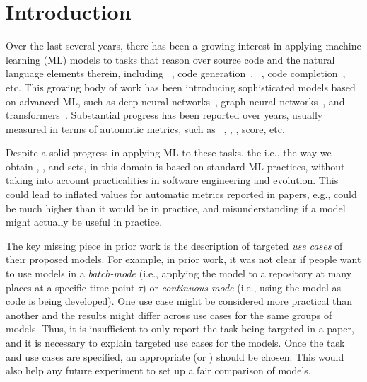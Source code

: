 \section{Introduction}
\label{sec:intro}

Over the last several years, there has been a growing interest in
applying machine learning (ML) models to
tasks that reason over source code and the natural language elements therein,
including
\comgen~\cite{IyerETAL16Summarizing, HuETAL18Deep,
  LeClairETAL20Improved, LeClairETAL19Neural, WanETAL18Improving,
  LiangAndZhu18Automatic, HuETAL18Summarizing, HuETAL19Deep,
  AhmadETAL20Transformer-based, CaiETAL20TAG,
  FernandesETAL19Structured}, code
generation~\cite{YinAndNeubig17Syntactic, LingETAL16Latent},
\methnam~\cite{AllamanisETAL16Convolutional, AlonETAL19code2seq,
  AlonETAL19Code2vec, FernandesETAL19Structured}, code
completion~\cite{AllamanisETAL18Learning}, etc.  This growing body of
work has been introducing sophisticated models based on advanced ML,
such as deep neural
networks~\cite{HuETAL18Deep,HuETAL19Deep,AlonETAL19code2seq}, graph
neural networks~\cite{ScarselliETAL08Graph, LeClairETAL20Improved},
and transformers~\cite{Vaswani17Attention,
  AhmadETAL20Transformer-based}.  Substantial progress has been
reported over years, usually measured in terms of automatic metrics,
such as \bleu~\cite{PapineniETAL02BLEU}, \precision, \recall, \fone
score, etc.


Despite a solid progress in applying ML to these tasks, the \emph{\emethodology}
i.e., the way we obtain \test, \val, and \train sets, in this domain
is based on standard ML practices, without taking into account 
practicalities in software engineering and evolution.
This could lead to inflated values for automatic metrics reported in
papers, e.g., \bleu could be much higher than it would be in practice,
and misunderstanding if a model might actually be useful in practice.

The key missing piece in prior work is the description of targeted
\emph{use cases} of their proposed models.  
For example, in prior work, it was not clear if
people want to use models in a \emph{batch-mode} (i.e., applying the
model to a repository at many places at a specific time point $\tau$)
or \emph{continuous-mode} (i.e., using the model as code is being
developed).
%
One use case might be considered more practical than another and the
results might differ across use cases for the same groups of models.
Thus, it is insufficient to only report the task being targeted in a
paper, and it is necessary to explain targeted use cases for the
models.  Once the task and use cases are specified, an appropriate
\emethodology (or \methodologies) should be chosen.  This would also
help any future experiment to set up a fair comparison of models.

